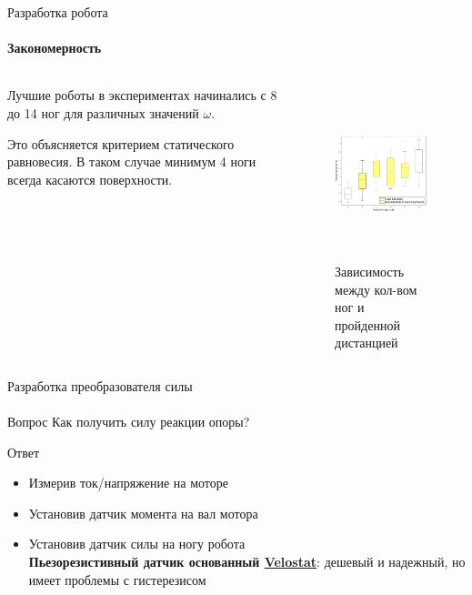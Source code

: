 \documentclass[aspectratio=169,xcolor=table]{beamer}
\begin{document}
\begin{frame}[t]{Разработка робота}
    \framesubtitle{Закономерность}
    \begin{columns}[T,onlytextwidth]
        \begin{column}{0.49\textwidth}
            Лучшие роботы в экспериментах начинались с 8 до 14 ног для различных значений $\omega$. 
            
            Это объясняется критерием статического равновесия. В таком случае минимум 4 ноги всегда касаются поверхности.    
        \end{column}
        \begin{column}{0.49\textwidth}
            \vspace{-1.8cm}
            \begin{figure}[H]
                \centering\includegraphics[height=5cm,width=1\textwidth,keepaspectratio]{box_plot_structural_synthesis.png}
                \caption*{Зависимость между кол-вом ног и пройденной дистанцией}
                \label{fig:box_plot_structural_synthesis.png}
            \end{figure}
        \end{column}
    \end{columns}
\end{frame}

\begin{frame}[t]{Разработка преобразователя силы}
    \framesubtitle{}
    {\large\begin{block}{Вопрос}
            Как получить силу реакции опоры?
        \end{block}}
    {\large\begin{alertblock}{Ответ}
        \vspace{-0.2cm}

         \begin{itemize}
            \color{lightgray}
            \item Измерив ток/напряжение на моторе
                \item Установив датчик момента на вал мотора
                \item {\color{black} Установив датчик силы на ногу робота \\  \alert{\textbf{Пьезорезистивный датчик основанный \underline{Velostat}}: дешевый и надежный, но имеет проблемы с гистерезисом}}
            \end{itemize}
        \end{alertblock}}
\end{frame}
\end{document}
